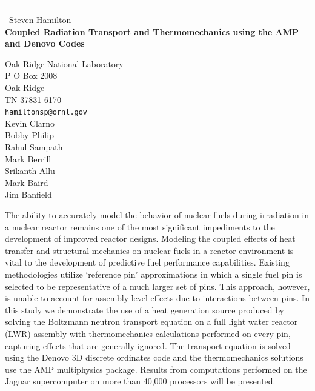\documentclass{report}
\begin{document}
\begin{center}
\rule{6in}{1pt} \
{\large Steven Hamilton \\
{\bf Coupled Radiation Transport and Thermomechanics using the AMP and Denovo Codes}}

Oak Ridge National Laboratory \\ P O Box 2008 \\ Oak Ridge \\ TN 37831-6170
\\
{\tt hamiltonsp@ornl.gov}\\
Kevin Clarno\\
Bobby Philip\\
Rahul Sampath\\
Mark Berrill\\
Srikanth Allu\\
Mark Baird\\
	Jim Banfield\end{center}

The ability to accurately model the behavior of nuclear fuels during
irradiation in a nuclear reactor remains one of the most significant
impediments to the development of improved reactor designs. Modeling the
coupled effects of heat transfer and structural mechanics on nuclear
fuels in a reactor environment is vital to the development of predictive
fuel performance capabilities. Existing methodologies utilize `reference
pin' approximations in which a single fuel pin is selected to be
representative of a much larger set of pins. This approach, however, is
unable to account for assembly-level effects due to interactions between
pins. In this study we demonstrate the use of a heat generation source
produced by solving the Boltzmann neutron transport equation on a full
light water reactor (LWR) assembly with thermomechanics calculations
performed on every pin, capturing effects that are generally ignored. The
transport equation is solved using the Denovo 3D discrete ordinates code
and the thermomechanics solutions use the AMP multiphysics package.
Results from computations performed on the Jaguar supercomputer on more
than 40,000 processors will be presented.
\end{document}
